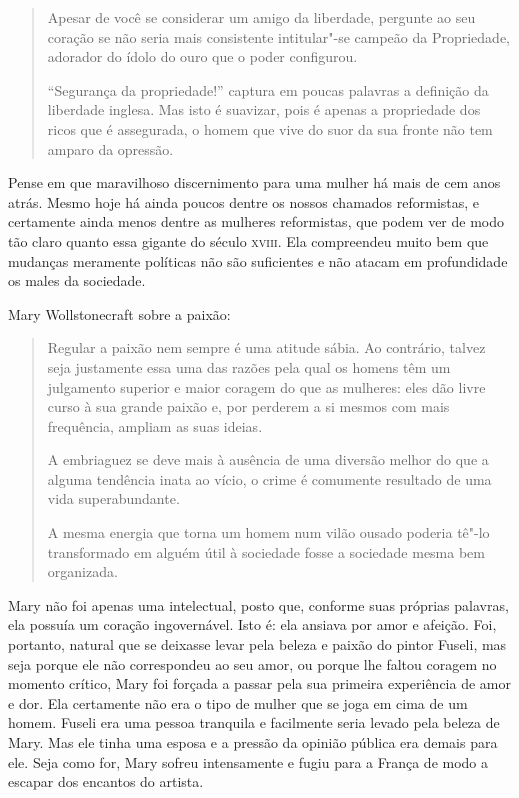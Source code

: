 \begin{quote}
Apesar de você se considerar um amigo da liberdade, pergunte ao seu
coração se não seria mais consistente intitular"-se campeão da
Propriedade, adorador do ídolo do ouro que o poder configurou.

``Segurança da propriedade!'' captura em poucas palavras a definição da
liberdade inglesa. Mas isto é suavizar, pois é apenas a propriedade dos
ricos que é assegurada, o homem que vive do suor da sua fronte não tem
amparo da opressão.
\end{quote}

Pense em que maravilhoso discernimento para uma mulher há mais de cem
anos atrás. Mesmo hoje há ainda poucos dentre os nossos chamados
reformistas, e certamente ainda menos dentre as mulheres reformistas,
que podem ver de modo tão claro quanto essa gigante do século \textsc{xviii}.
Ela compreendeu muito bem que mudanças meramente políticas não são
suficientes e não atacam em profundidade os males da sociedade.

Mary Wollstonecraft sobre a paixão:

\begin{quote}
Regular a paixão nem sempre é uma atitude sábia. Ao contrário, talvez
seja justamente essa uma das razões pela qual os homens têm um
julgamento superior e maior coragem do que as mulheres: eles dão livre
curso à sua grande paixão e, por perderem a si mesmos com mais
frequência, ampliam as suas ideias.

A embriaguez se deve mais à ausência de uma diversão melhor do que a
alguma tendência inata ao vício, o crime é comumente resultado de uma
vida superabundante.

A mesma energia que torna um homem num vilão ousado poderia tê"-lo
transformado em alguém útil à sociedade fosse a sociedade mesma bem
organizada.
\end{quote}

Mary não foi apenas uma intelectual, posto que, conforme suas próprias
palavras, ela possuía um coração ingovernável. Isto é: ela ansiava por
amor e afeição. Foi, portanto, natural que se deixasse levar pela beleza
e paixão do pintor Fuseli, mas seja porque ele não correspondeu ao seu
amor, ou porque lhe faltou coragem no momento crítico, Mary foi forçada
a passar pela sua primeira experiência de amor e dor. Ela certamente não
era o tipo de mulher que se joga em cima de um homem. Fuseli era uma
pessoa tranquila e facilmente seria levado pela beleza de Mary. Mas ele
tinha uma esposa e a pressão da opinião pública era demais para ele.
Seja como for, Mary sofreu intensamente e fugiu para a França de modo a
escapar dos encantos do artista.

